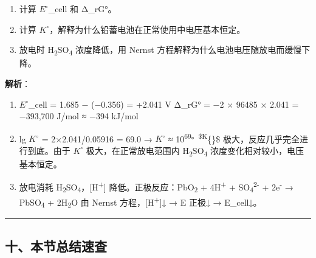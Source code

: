 \begin{enumerate}
\def\labelenumi{(\alph{enumi})}
\tightlist
\item
  计算 \(E^{\circ}\)\_cell 和 Δ\_rG°。
\item
  计算 \(K^{\circ}\)，解释为什么铅蓄电池在正常使用中电压基本恒定。
\item
  放电时 H\textsubscript{2}SO\textsubscript{4} 浓度降低，用 Nernst 方程解释为什么电池电压随放电而缓慢下降。
\end{enumerate}

\textbf{解析}：

\begin{enumerate}
\def\labelenumi{(\alph{enumi})}
\item
  \(E^{\circ}\)\_cell = 1.685 − (−0.356) = +2.041 V
  Δ\_rG° = −2 × 96485 × 2.041 = −393,700 J/mol ≈ −394 kJ/mol
\item
  lg \(K^{\circ}\) = 2×2.041/0.05916 = 69.0 → \(K^{\circ}\) ≈ 10\textsuperscript{69。\$K}\{\circ\}\$ 极大，反应几乎完全进行到底。由于 \(K^{\circ}\) 极大，在正常放电范围内 H\textsubscript{2}SO\textsubscript{4} 浓度变化相对较小，电压基本恒定。
\item
  放电消耗 H\textsubscript{2}SO\textsubscript{4}，{[}H\textsuperscript{+}{]} 降低。正极反应：PbO\textsubscript{2} + 4H\textsuperscript{+} + SO\textsubscript{4}\textsuperscript{2-} + 2e\textsuperscript{-} → PbSO\textsubscript{4} + 2H\textsubscript{2}O
  由 Nernst 方程，{[}H\textsuperscript{+}{]}↓ → E 正极↓ → E\_cell↓。
\end{enumerate}

\begin{center}\rule{0.5\linewidth}{0.5pt}\end{center}

\subsection{十、本节总结速查}\label{ux5341ux672cux8282ux603bux7ed3ux901fux67e5}


